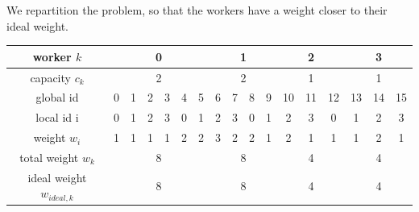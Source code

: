 We repartition the problem, so that the workers have a weight closer to their ideal weight.

\begin{table}[H]
	\begin{center}
		\begin{tabular}{ | c | c | c | c | c | c | c | c | c | c | c | c | c | c | c | c | c | } 
			\hline
			worker \(k\) & \multicolumn{6}{c|}{\cellcolor{vs_lightgreen}0} & \multicolumn{4}{c|}{\cellcolor{vs_lightblue}1} & \multicolumn{3}{c|}{\cellcolor{vs_lightred}2} & \multicolumn{3}{c|}{\cellcolor{vs_lightplum}3}  \\
			\hline
			capacity \(c_k\) & \multicolumn{6}{c|}{\cellcolor{vs_lightgreen}2} & \multicolumn{4}{c|}{\cellcolor{vs_lightblue}2} & \multicolumn{3}{c|}{\cellcolor{vs_lightred}1} & \multicolumn{3}{c|}{\cellcolor{vs_lightplum}1}  \\
			\hline
			global id & \cellcolor{vs_lightgreen}0 & \cellcolor{vs_lightgreen}1 & \cellcolor{vs_lightgreen}2 & \cellcolor{vs_lightgreen}3 & \cellcolor{vs_lightgreen}4 & \cellcolor{vs_lightgreen}5 & \cellcolor{vs_lightblue}6 & \cellcolor{vs_lightblue}7 & \cellcolor{vs_lightblue}8 & \cellcolor{vs_lightblue}9 & \cellcolor{vs_lightred}10 & \cellcolor{vs_lightred}11 & \cellcolor{vs_lightred}12 & \cellcolor{vs_lightplum}13 & \cellcolor{vs_lightplum}14 & \cellcolor{vs_lightplum}15 \\ 
			\hline
			local id i & \cellcolor{vs_lightgreen}0 & \cellcolor{vs_lightgreen}1 & \cellcolor{vs_lightgreen}2 & \cellcolor{vs_lightgreen}3 & \cellcolor{vs_lightgreen}0 & \cellcolor{vs_lightgreen}1 & \cellcolor{vs_lightblue}2 & \cellcolor{vs_lightblue}3 & \cellcolor{vs_lightblue}0 & \cellcolor{vs_lightblue}1 & \cellcolor{vs_lightred}2 & \cellcolor{vs_lightred}3 & \cellcolor{vs_lightred}0 & \cellcolor{vs_lightplum}1 & \cellcolor{vs_lightplum}2 & \cellcolor{vs_lightplum}3 \\ 
			\hline
			weight \(w_i\) & \cellcolor{vs_lightgreen}1 & \cellcolor{vs_lightgreen}1 & \cellcolor{vs_lightgreen}1 & \cellcolor{vs_lightgreen}1 & \cellcolor{vs_lightgreen}2 & \cellcolor{vs_lightgreen}2 & \cellcolor{vs_lightblue}3 & \cellcolor{vs_lightblue}2 & \cellcolor{vs_lightblue}2 & \cellcolor{vs_lightblue}1 & \cellcolor{vs_lightred}2 & \cellcolor{vs_lightred}1 & \cellcolor{vs_lightred}1 & \cellcolor{vs_lightplum}1 & \cellcolor{vs_lightplum}2 & \cellcolor{vs_lightplum}1 \\ 
			\hline
			total weight \(w_k\) & \multicolumn{6}{c|}{\cellcolor{vs_lightgreen}8} & \multicolumn{4}{c|}{\cellcolor{vs_lightblue}8} & \multicolumn{3}{c|}{\cellcolor{vs_lightred}4} & \multicolumn{3}{c|}{\cellcolor{vs_lightplum}4} \\ 
			\hline
			ideal weight \(w_{ideal,k}\) & \multicolumn{6}{c|}{\cellcolor{vs_lightgreen}8} & \multicolumn{4}{c|}{\cellcolor{vs_lightblue}8} & \multicolumn{3}{c|}{\cellcolor{vs_lightred}4} & \multicolumn{3}{c|}{\cellcolor{vs_lightplum}4} \\ 
			\hline
		\end{tabular}
	

\end{center}
\end{table}

